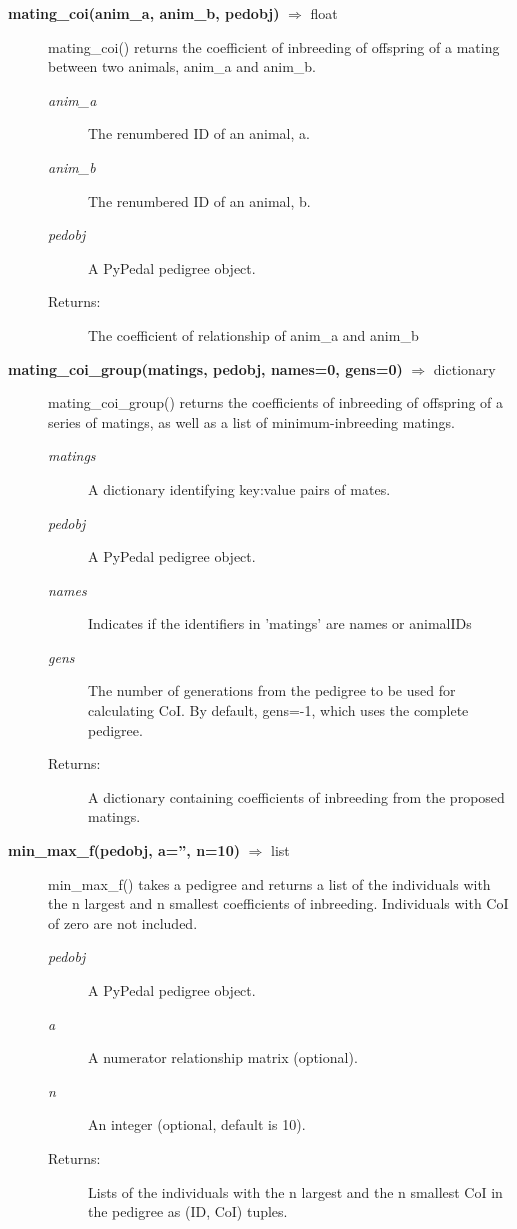 \begin{description}
\item[\textbf{mating\_coi(anim\_a, anim\_b, pedobj)} $\Rightarrow$ float]
mating\_coi() returns the coefficient of inbreeding of offspring of a mating between two animals, anim\_a and anim\_b.
\begin{description}
\item[\emph{anim\_a}] The renumbered ID of an animal, a.
\item[\emph{anim\_b}] The renumbered ID of an animal, b.
\item[\emph{pedobj}] A PyPedal pedigree object.
\item[Returns:] The coefficient of relationship of anim\_a and anim\_b
\end{description}

\item[\textbf{mating\_coi\_group(matings, pedobj, names=0, gens=0)} $\Rightarrow$ dictionary]
mating\_coi\_group() returns the coefficients of inbreeding of offspring of a series of matings, as well as a list of minimum-inbreeding matings.
\begin{description}
\item[\emph{matings}] A dictionary identifying key:value pairs of mates.
\item[\emph{pedobj}] A PyPedal pedigree object.
\item[\emph{names}] Indicates if the identifiers in 'matings' are names or animalIDs
\item[\emph{gens}] The number of generations from the pedigree to be used for calculating CoI. By default, gens=-1, which uses the complete pedigree.
\item[Returns:] A dictionary containing coefficients of inbreeding from the proposed matings.
\end{description}

\item[\textbf{min\_max\_f(pedobj, a='', n=10)} $\Rightarrow$ list]
min\_max\_f() takes a pedigree and returns a list of the individuals with the n largest and n smallest coefficients of inbreeding. Individuals with CoI of zero are not included.
\begin{description}
\item[\emph{pedobj}] A PyPedal pedigree object.
\item[\emph{a}] A numerator relationship matrix (optional).
\item[\emph{n}] An integer (optional, default is 10).
\item[Returns:] Lists of the individuals with the n largest and the n smallest CoI in the pedigree as (ID, CoI) tuples.
\end{description}


\end{description}
